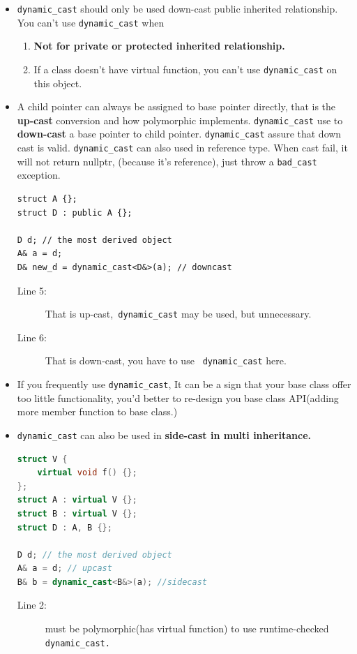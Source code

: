 \documentclass[a4paper,11pt,twoside]{book}
\begin{document}
\begin{itemize}
	
	\item \texttt{dynamic\_cast} should only be used down-cast public inherited relationship. You can't use \texttt{dynamic\_cast} when
	\begin{enumerate}
		\item \textbf{Not for private or protected inherited relationship.}
		\item If a class doesn't have virtual function, you can't use \texttt{dynamic\_cast} on this object.
	\end{enumerate}
	
	\item A child pointer can always be assigned to base pointer directly, that is the \textbf{up-cast} conversion and how polymorphic implements. \texttt{dynamic\_cast} use to \textbf{down-cast} a base pointer to child pointer. \texttt{dynamic\_cast} assure that down cast is valid. \texttt{dynamic\_cast} can also used in reference type. When cast fail, it will not return nullptr, (because it's reference), just throw a \texttt{bad\_cast} exception.
	
\begin{lstlisting}
struct A {};
struct D : public A {};

D d; // the most derived object
A& a = d;
D& new_d = dynamic_cast<D&>(a); // downcast
\end{lstlisting}
\begin{description}
	\item[Line 5:] That is up-cast,\texttt{ dynamic\_cast} may be used, but unnecessary.
	\item[Line 6:] That is down-cast, you have to use \texttt{ dynamic\_cast} here. 
\end{description}
	
	\item If you frequently use \texttt{dynamic\_cast}, It can be a sign that your base class offer too little functionality, you'd better to re-design you base class API(adding more member function to base class.)
	
	\item \texttt{dynamic\_cast} can also be used in \textbf{side-cast in multi inheritance. }
\begin{lstlisting}[frame=single, language=c++, mathescape=true]
struct V {
	virtual void f() {};
};
struct A : virtual V {};
struct B : virtual V {};
struct D : A, B {};
	
D d; // the most derived object
A& a = d; // upcast 
B& b = dynamic_cast<B&>(a); //sidecast
	\end{lstlisting}
\begin{description}
	\item[Line 2:] must be polymorphic(has virtual function) to use runtime-checked \texttt{dynamic\_cast.}
	

\end{description}
\end{itemize}
\end{document}
